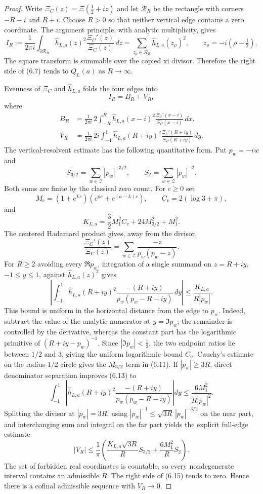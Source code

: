 \documentclass[11pt]{article}
\newcommand{\XiR}{\Xi}
\newcommand{\cZ}{\mathcal Z}
\begin{document}
\begin{proof}
Write $\Xi_C(z)=\XiR(\frac12+iz)$ and let $\mathcal R_R$ be the rectangle with corners
$-R-i$ and $R+i$.  Choose $R>0$ so that neither vertical edge contains a zero coordinate.  The
argument principle, with analytic multiplicity, gives
\[
 I_R:=\frac1{2\pi i}\int_{\partial\mathcal R_R}
   \widehat h_{L,a}(z)^2\frac{\Xi_C'(z)}{\Xi_C(z)}\,dz
 =\sum_{z_\rho\in\mathcal R_R}\widehat h_{L,a}(z_\rho)^2,
 \qquad z_\rho=-i(\rho-\tfrac12).
 \tag{6.7}
\]
The square transform is summable over the copied xi divisor.  Therefore the right side of
\textup{(6.7)} tends to $Q_L(a)$ as $R\to\infty$.

Evenness of $\Xi_C$ and $\widehat h_{L,a}$ folds the four edges into
\[
 I_R=B_R+V_R,
 \tag{6.8}
\]
where
\[
 \begin{aligned}
 B_R&=\frac1{2\pi i}\,2\int_{-R}^{R}
   \widehat h_{L,a}(x-i)^2
   \frac{\Xi_C'(x-i)}{\Xi_C(x-i)}\,dx,\\
 V_R&=\frac1{2\pi i}\,2i\int_{-1}^{1}
   \widehat h_{L,a}(R+iy)^2
   \frac{\Xi_C'(R+iy)}{\Xi_C(R+iy)}\,dy.
 \end{aligned}
 \tag{6.9}
\]
The vertical-resolvent estimate has the following quantitative form.  Put $p_w=-iw$ and
\[
 S_{3/2}=\sum_{w\in\cZ}|p_w|^{-3/2},\qquad
 S_2=\sum_{w\in\cZ}|p_w|^{-2}.
 \tag{6.10}
\]
Both sums are finite by the classical zero count.  For $c\ge0$ set
\[
 M_c=(1+e^{Lc})(e^{ac}+e^{(a-L)c}),\qquad
 C_v=2(\log3+\pi),
\]
and
\[
 K_{L,a}=\frac32M_1^2C_v+24M_{3/2}^2+M_1^2.
 \tag{6.11}
\]
The centered Hadamard product gives, away from the divisor,
\[
 \frac{\Xi_C'(z)}{\Xi_C(z)}
 =\sum_{w\in\cZ}\frac{-z}{p_w(p_w-z)}.
 \tag{6.12}
\]
For $R\ge2$ avoiding every $\Re p_w$, integration of a single summand on
$z=R+iy$, $-1\le y\le1$, against $\widehat h_{L,a}(z)^2$ gives
\[
 \left|\int_{-1}^{1}\widehat h_{L,a}(R+iy)^2
       \frac{-(R+iy)}{p_w(p_w-R-iy)}\,dy\right|
 \le \frac{K_{L,a}}{R|p_w|}.
 \tag{6.13}
\]
This bound is uniform in the horizontal distance from the edge to $p_w$.  Indeed, subtract the
value of the analytic numerator at $y=\Im p_w$; the remainder is controlled by the derivative,
whereas the constant part has the logarithmic primitive of $(R+iy-p_w)^{-1}$.  Since
$|\Im p_w|<\frac12$, the two endpoint ratios lie between $1/2$ and $3$, giving the uniform
logarithmic bound $C_v$.  Cauchy's estimate on the radius-$1/2$ circle gives the $M_{3/2}$ term
in \textup{(6.11)}.  If $|p_w|\ge3R$, direct denominator separation improves
\textup{(6.13)} to
\[
 \int_{-1}^{1}\left|\widehat h_{L,a}(R+iy)^2
       \frac{-(R+iy)}{p_w(p_w-R-iy)}\right|dy
 \le \frac{6M_1^2}{R|p_w|^2}.
 \tag{6.14}
\]
Splitting the divisor at $|p_w|=3R$, using
$|p_w|^{-1}\le\sqrt{3R}\,|p_w|^{-3/2}$ on the near part, and interchanging sum and integral on
the far part yields the explicit full-edge estimate
\[
 |V_R|\le\frac1\pi\left(
   \frac{K_{L,a}\sqrt{3R}}{R}S_{3/2}
   +\frac{6M_1^2}{R}S_2\right).
 \tag{6.15}
\]
The set of forbidden real coordinates is countable, so every nondegenerate interval contains an
admissible $R$.  The right side of \textup{(6.15)} tends to zero.  Hence there is a cofinal
admissible sequence with $V_R\to0$.


\end{proof}
\end{document}
